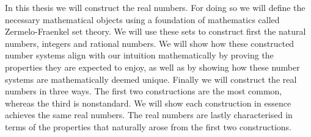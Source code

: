 \documentclass[../main.tex]{subfiles}
\begin{document}
In this thesis we will construct the real numbers. For doing so we will define the necessary mathematical objects using a foundation of mathematics called Zermelo-Fraenkel set theory. We will use these sets to construct first the natural numbers, integers and rational numbers. We will show how these constructed number systems align with our intuition mathematically by proving the properties they are expected to enjoy, as well as by showing how these number systems are mathematically deemed unique. Finally we will construct the real numbers in three ways. The first two constructions are the most common, whereas the third is nonstandard. We will show each construction in essence achieves the same real numbers. The real numbers are lastly characterised in terms of the properties that naturally arose from the first two constructions.
\end{document}
